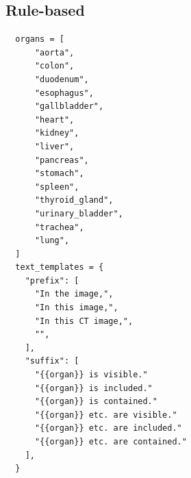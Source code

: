 \documentclass[bioengineering,article,submit,pdftex,moreauthors]{Definitions/mdpi}
\begin{document}
\subsection{Rule-based}
\begin{verbatim}
  organs = [
      "aorta",
      "colon",
      "duodenum",
      "esophagus",
      "gallbladder",
      "heart",
      "kidney",
      "liver",
      "pancreas",
      "stomach",
      "spleen",
      "thyroid_gland",
      "urinary_bladder",
      "trachea",
      "lung",
  ]
  text_templates = {
    "prefix": [
      "In the image,",
      "In this image,",
      "In this CT image,",
      "",
    ],
    "suffix": [
      "{{organ}} is visible."
      "{{organ}} is included."
      "{{organ}} is contained."
      "{{organ}} etc. are visible."
      "{{organ}} etc. are included."
      "{{organ}} etc. are contained."
    ],
  }
\end{verbatim}
\end{document}
